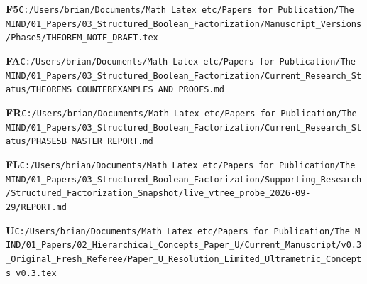 \documentclass[10pt,letterpaper]{article}
\begin{document}
\noindent\textbf{F5}\quad \texttt{C:/\allowbreak{}Users/\allowbreak{}brian/\allowbreak{}Documents/\allowbreak{}Math\ Latex\ etc/\allowbreak{}Papers\ for\ Publication/\allowbreak{}The\ MIND/\allowbreak{}01\_\allowbreak{}Papers/\allowbreak{}03\_\allowbreak{}Structured\_\allowbreak{}Boolean\_\allowbreak{}Factorization/\allowbreak{}Manuscript\_\allowbreak{}Versions/\allowbreak{}Phase5/\allowbreak{}THEOREM\_\allowbreak{}NOTE\_\allowbreak{}DRAFT.tex}\par
\noindent\textbf{FA}\quad \texttt{C:/\allowbreak{}Users/\allowbreak{}brian/\allowbreak{}Documents/\allowbreak{}Math\ Latex\ etc/\allowbreak{}Papers\ for\ Publication/\allowbreak{}The\ MIND/\allowbreak{}01\_\allowbreak{}Papers/\allowbreak{}03\_\allowbreak{}Structured\_\allowbreak{}Boolean\_\allowbreak{}Factorization/\allowbreak{}Current\_\allowbreak{}Research\_\allowbreak{}Status/\allowbreak{}THEOREMS\_\allowbreak{}COUNTEREXAMPLES\_\allowbreak{}AND\_\allowbreak{}PROOFS.md}\par
\noindent\textbf{FR}\quad \texttt{C:/\allowbreak{}Users/\allowbreak{}brian/\allowbreak{}Documents/\allowbreak{}Math\ Latex\ etc/\allowbreak{}Papers\ for\ Publication/\allowbreak{}The\ MIND/\allowbreak{}01\_\allowbreak{}Papers/\allowbreak{}03\_\allowbreak{}Structured\_\allowbreak{}Boolean\_\allowbreak{}Factorization/\allowbreak{}Current\_\allowbreak{}Research\_\allowbreak{}Status/\allowbreak{}PHASE5B\_\allowbreak{}MASTER\_\allowbreak{}REPORT.md}\par
\noindent\textbf{FL}\quad \texttt{C:/\allowbreak{}Users/\allowbreak{}brian/\allowbreak{}Documents/\allowbreak{}Math\ Latex\ etc/\allowbreak{}Papers\ for\ Publication/\allowbreak{}The\ MIND/\allowbreak{}01\_\allowbreak{}Papers/\allowbreak{}03\_\allowbreak{}Structured\_\allowbreak{}Boolean\_\allowbreak{}Factorization/\allowbreak{}Supporting\_\allowbreak{}Research/\allowbreak{}Structured\_\allowbreak{}Factorization\_\allowbreak{}Snapshot/\allowbreak{}live\_\allowbreak{}vtree\_\allowbreak{}probe\_\allowbreak{}2026-\allowbreak{}09-\allowbreak{}29/\allowbreak{}REPORT.md}\par
\noindent\textbf{U}\quad \texttt{C:/\allowbreak{}Users/\allowbreak{}brian/\allowbreak{}Documents/\allowbreak{}Math\ Latex\ etc/\allowbreak{}Papers\ for\ Publication/\allowbreak{}The\ MIND/\allowbreak{}01\_\allowbreak{}Papers/\allowbreak{}02\_\allowbreak{}Hierarchical\_\allowbreak{}Concepts\_\allowbreak{}Paper\_\allowbreak{}U/\allowbreak{}Current\_\allowbreak{}Manuscript/\allowbreak{}v0.3\_\allowbreak{}Original\_\allowbreak{}Fresh\_\allowbreak{}Referee/\allowbreak{}Paper\_\allowbreak{}U\_\allowbreak{}Resolution\_\allowbreak{}Limited\_\allowbreak{}Ultrametric\_\allowbreak{}Concepts\_\allowbreak{}v0.3.tex}\par
\end{document}
